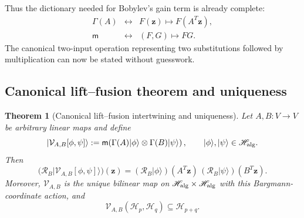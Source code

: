 \documentclass[11pt,oneside]{article}
\numberwithin{equation}{section}
\newtheorem{theorem}{Theorem}[section]
\theoremstyle{definition}
\begin{document}
Thus the dictionary needed for Bobylev's gain term is already complete:
\begin{equation}
\begin{array}{ccl}
\Gamma(A) &\longleftrightarrow& F(\bm z)\mapsto F(A^T\bm z),\\[1mm]
\mathsf m &\longleftrightarrow& (F,G)\mapsto FG.
\end{array}
\label{eq:maxwell_lift_fusion_dictionary}
\end{equation}
The canonical two-input operation representing two substitutions followed by multiplication can now be stated without guesswork.

\subsection{Canonical lift--fusion theorem and uniqueness}
\label{subsec:maxwell_lift_fusion_theorem_statement}

\begin{theorem}[Canonical lift--fusion intertwining and uniqueness]
\label{thm:maxwell_canonical_lift_fusion}
Let $A,B:V\to V$ be arbitrary linear maps and define
\begin{equation}
|\mathcal V_{A,B}[\phi,\psi]\rangle
:=
\mathsf m\!\left(
\Gamma(A)|\phi\rangle
\otimes
\Gamma(B)|\psi\rangle
\right),
\qquad
|\phi\rangle,|\psi\rangle\in\mathscr H_{\rm alg}.
\label{eq:maxwell_general_lift_fusion_map}
\end{equation}
Then
\begin{equation}
\boxed{
\bigl(\mathcal R_B|\mathcal V_{A,B}[\phi,\psi]\rangle\bigr)(\bm z)
=
(\mathcal R_B|\phi\rangle)(A^T\bm z)\,
(\mathcal R_B|\psi\rangle)(B^T\bm z).
}
\label{eq:maxwell_general_lift_fusion_intertwining}
\end{equation}
Moreover, $\mathcal V_{A,B}$ is the unique bilinear map on $\mathscr H_{\rm alg}\times\mathscr H_{\rm alg}$ with this Bargmann-coordinate action, and
\begin{equation}
\mathcal V_{A,B}(\mathscr H_p,\mathscr H_q)
\subseteq\mathscr H_{p+q}.
\label{eq:maxwell_general_lift_fusion_grading}
\end{equation}
\end{theorem}
\end{document}
